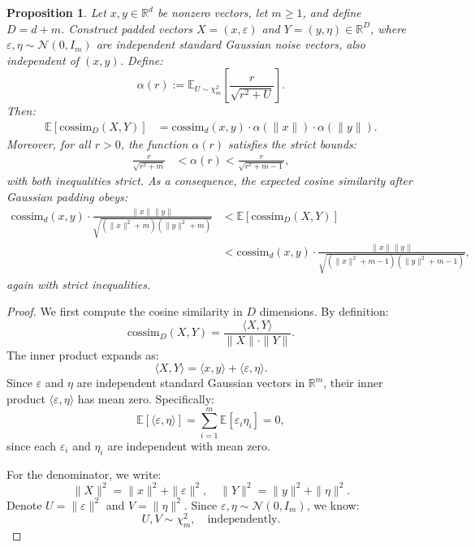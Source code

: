 \documentclass{article}
\theoremstyle{plain}
\newtheorem{proposition}[theorem]{Proposition}
\theoremstyle{definition}
\theoremstyle{remark}
\begin{document}
\begin{appendices}
\begin{proposition}
\label{prop:gaussian_padding_shrink}
Let $x, y \in \mathbb{R}^d$ be nonzero vectors, let $m \ge 1$, and define $D = d + m$. Construct padded vectors $X = (x, \varepsilon)$ and $Y = (y, \eta) \in \mathbb{R}^D$, where $\varepsilon, \eta \sim \mathcal{N}(0, I_m)$ are independent standard Gaussian noise vectors, also independent of $(x, y)$. Define:
\[
\alpha(r) := \mathbb{E}_{U \sim \chi^2_m} \left[ \frac{r}{\sqrt{r^2 + U}} \right].
\]
Then:
\begin{align}
\mathbb{E}[\mathrm{cossim}_D(X,Y)]
&= \mathrm{cossim}_d(x,y) \cdot \alpha(\|x\|) \cdot \alpha(\|y\|). \label{eq:main_identity}
\end{align}
Moreover, for all $r > 0$, the function $\alpha(r)$ satisfies the strict bounds:
\begin{align}
\frac{r}{\sqrt{r^2 + m}} &< \alpha(r) < \frac{r}{\sqrt{r^2 + m - 1}}, \label{eq:alpha_bounds}
\end{align}
with both inequalities strict. As a consequence, the expected cosine similarity after Gaussian padding obeys:
\begin{align}
\mathrm{cossim}_d(x,y) \cdot
\frac{\|x\| \|y\|}{\sqrt{(\|x\|^2 + m)(\|y\|^2 + m)}}
&< \mathbb{E}[\mathrm{cossim}_D(X,Y)] \\
&< \mathrm{cossim}_d(x,y) \cdot
\frac{\|x\| \|y\|}{\sqrt{(\|x\|^2 + m - 1)(\|y\|^2 + m - 1)}}, \label{eq:cossim_bounds}
\end{align}
again with strict inequalities.
\end{proposition}

\begin{proof}
We first compute the cosine similarity in $D$ dimensions. By definition:
\[
\mathrm{cossim}_D(X,Y) = \frac{\langle X, Y \rangle}{\|X\| \cdot \|Y\|}.
\]
The inner product expands as:
\[
\langle X, Y \rangle = \langle x, y \rangle + \langle \varepsilon, \eta \rangle.
\]
Since $\varepsilon$ and $\eta$ are independent standard Gaussian vectors in $\mathbb{R}^m$, their inner product $\langle \varepsilon, \eta \rangle$ has mean zero. Specifically:
\[
\mathbb{E}[\langle \varepsilon, \eta \rangle] = \sum_{i=1}^m \mathbb{E}[\varepsilon_i \eta_i] = 0,
\]
since each $\varepsilon_i$ and $\eta_i$ are independent with mean zero.

For the denominator, we write:
\[
\|X\|^2 = \|x\|^2 + \|\varepsilon\|^2, \quad \|Y\|^2 = \|y\|^2 + \|\eta\|^2.
\]
Denote $U = \|\varepsilon\|^2$ and $V = \|\eta\|^2$. Since $\varepsilon, \eta \sim \mathcal{N}(0, I_m)$, we know:
\[
U, V \sim \chi^2_m, \quad \text{independently}.
\]


\end{proof}
\end{appendices}
\end{document}
